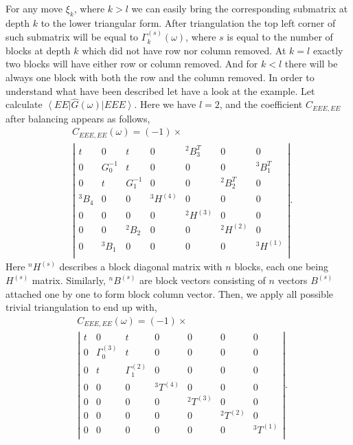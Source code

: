 \documentclass{article}
\newcommand{\ket}[1]{\left\vert #1 \right\rangle}
\newcommand{\bra}[1]{\left\langle #1 \right\vert}
\begin{document}
For any move $\xi_k$, where $k > l$ we can easily bring the corresponding submatrix at depth $k$ to the lower triangular form. After triangulation the top left corner of such submatrix will be equal to $\Gamma_k^{(s)}(\omega)$, where $s$ is equal to the number of blocks at depth $k$ which did not have row nor column removed. At $k = l$ exactly two blocks will have either row or column removed. And for $k < l$ there will be always one block with both the row and the column removed. In order to understand what have been described let have a look at the example. Let calculate $\bra{EE}\hat{G}(\omega)\ket{EEE}$. Here we have $l = 2$, and the coefficient $C_{EEE,EE}$ after balancing appears as follows,
\begin{equation}
\begin{split}
    &C_{EEE,EE}(\omega) = (-1) \times\\ 
    &\left\vert
    \begin{array}{c|c|c|c|c|c|c}
        t & 0 & t & 0 & ^2B_3^T & 0 & 0 \\
        \hline
        0 & G_0^{-1} & t & 0 & 0 & 0 & ^3B_1^T \\
        \hline
        0 & t & G_1^{-1} & 0 & 0 & ^2B_2^T & 0 \\
        \hline
        ^3B_4 & 0 & 0 & ^3H^{(4)} & 0 & 0 & 0 \\
        \hline
        0 & 0 & 0 & 0 & ^2H^{(3)} & 0 & 0 \\
        \hline
        0 & 0 & ^2B_2 & 0 & 0 & ^2H^{(2)} & 0 \\
        \hline
        0 & ^3B_1 & 0 & 0 & 0 & 0 & ^3H^{(1)} \\
    \end{array}
    \right\vert.
\end{split}
\end{equation}
Here $^nH^{(s)}$ describes a block diagonal matrix with $n$ blocks, each one being $H^{(s)}$ matrix. Similarly, $^nB^{(s)}$ are block vectors consisting of $n$ vectors $B^{(s)}$ attached one by one to form block column vector. Then, we apply all possible trivial triangulation to end up with,
\begin{equation}
\begin{split}
    &C_{EEE,EE}(\omega) = (-1) \times\\ 
    &\left\vert
    \begin{array}{c|c|c|c|c|c|c}
        t & 0 & t & 0 & 0 & 0 & 0 \\
        \hline
        0 & \Gamma_0^{(3)} & t & 0 & 0 & 0 & 0 \\
        \hline
        0 & t & \Gamma_1^{(2)} & 0 & 0 & 0 & 0 \\
        \hline
        0 & 0 & 0 & ^3T^{(4)} & 0 & 0 & 0 \\
        \hline
        0 & 0 & 0 & 0 & ^2T^{(3)} & 0 & 0 \\
        \hline
        0 & 0 & 0 & 0 & 0 & ^2T^{(2)} & 0 \\
        \hline
        0 & 0 & 0 & 0 & 0 & 0 & ^3T^{(1)} \\
    \end{array}
    \right\vert.
\end{split}
\end{equation}
\end{document}
